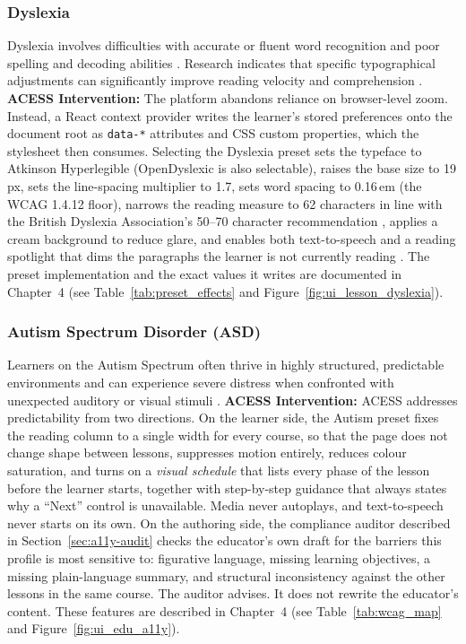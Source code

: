 \documentclass[12pt, oneside]{article} %
\begin{document}
\subsubsection{Dyslexia}
Dyslexia involves difficulties with accurate or fluent word recognition and poor spelling and decoding abilities \cite{rello2013effect}. Research indicates that specific typographical adjustments can significantly improve reading velocity and comprehension \cite{franceschini_dyslexia}.
\textbf{ACESS Intervention:} The platform abandons reliance on browser-level zoom. Instead, a React context provider writes the learner's stored preferences onto the document root as \texttt{data-*} attributes and CSS custom properties, which the stylesheet then consumes. Selecting the Dyslexia preset sets the typeface to Atkinson Hyperlegible \cite{atkinson2021atkinson} (OpenDyslexic \cite{opendyslexic} is also selectable), raises the base size to 19\,px, sets the line-spacing multiplier to 1.7, sets word spacing to 0.16\,em (the WCAG 1.4.12 floor), narrows the reading measure to 62 characters in line with the British Dyslexia Association's 50--70 character recommendation \cite{bda_style_guide}, applies a cream background to reduce glare, and enables both text-to-speech and a reading spotlight that dims the paragraphs the learner is not currently reading \cite{batanero2014accessibility}. The preset implementation and the exact values it writes are documented in Chapter~4 (see Table~\ref{tab:preset_effects} and Figure~\ref{fig:ui_lesson_dyslexia}).

\subsubsection{Autism Spectrum Disorder (ASD)}
Learners on the Autism Spectrum often thrive in highly structured, predictable environments and can experience severe distress when confronted with unexpected auditory or visual stimuli \cite{lawson2011autism}.
\textbf{ACESS Intervention:} ACESS addresses predictability from two directions. On the learner side, the Autism preset fixes the reading column to a single width for every course, so that the page does not change shape between lessons, suppresses motion entirely, reduces colour saturation, and turns on a \emph{visual schedule} that lists every phase of the lesson before the learner starts, together with step-by-step guidance that always states why a ``Next'' control is unavailable. Media never autoplays, and text-to-speech never starts on its own. On the authoring side, the compliance auditor described in Section~\ref{sec:a11y-audit} checks the educator's own draft for the barriers this profile is most sensitive to: figurative language, missing learning objectives, a missing plain-language summary, and structural inconsistency against the other lessons in the same course. The auditor advises. It does not rewrite the educator's content. These features are described in Chapter~4 (see Table~\ref{tab:wcag_map} and Figure~\ref{fig:ui_edu_a11y}).
\end{document}
